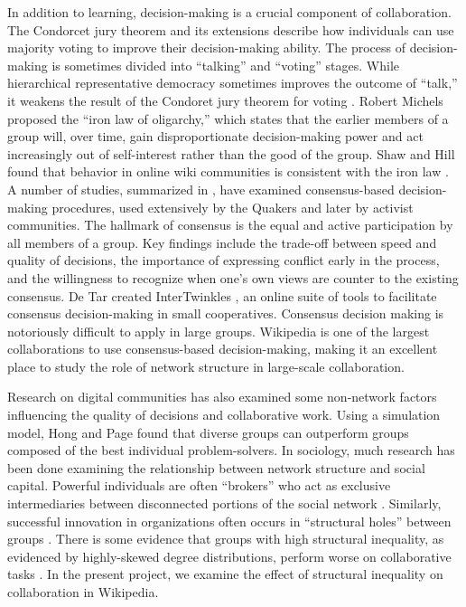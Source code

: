 In addition to learning, decision-making is a crucial component of collaboration.
The Condorcet jury theorem and its extensions \cite{list_epistemic_2001}
describe how individuals can use majority voting to improve their
decision-making ability.
The process of decision-making is sometimes divided into
``talking'' and ``voting'' stages.
While hierarchical representative democracy sometimes improves the outcome
of ``talk,'' it weakens the result of the Condoret jury theorem for voting
\cite{list_epistemic_2001}.
Robert Michels proposed the ``iron law of oligarchy,''
\cite{michels_political_1999} which states that
the earlier members of a group will, over time, gain disproportionate
decision-making power and act increasingly out of self-interest rather than
the good of the group.
Shaw and Hill found that behavior in online wiki communities is consistent
with the iron law \cite{shaw_laboratories_2014}.
A number of studies, summarized in \cite{gentry_consensus_1982},
have examined consensus-based decision-making procedures, used extensively by
the Quakers and later by activist communities.
The hallmark of consensus is the equal and active participation by all members
of a group.
Key findings include the trade-off between speed and quality of decisions,
the importance of expressing conflict early in the process,
and the willingness to recognize when one's own views are counter to the
existing consensus.
De Tar created InterTwinkles \cite{detar_intertwinkles:_2013},
an online suite of tools to facilitate consensus decision-making
in small cooperatives.
Consensus decision making is notoriously difficult to apply in large groups.
Wikipedia is one of the largest collaborations to use consensus-based
decision-making,
making it an excellent place to study the role of network structure in
large-scale collaboration.

Research on digital communities has also examined some non-network factors
influencing the quality of decisions and collaborative work.
Using a simulation model, Hong and Page \cite{hong_groups_2004} found that
diverse groups can outperform groups composed of the best individual
problem-solvers.
In sociology, much research has been done examining the relationship between
network structure and social capital.
Powerful individuals are often ``brokers''
who act as exclusive intermediaries between disconnected portions of the
social network \mbox{\cite{silverman_patronage_1965}}.
Similarly, successful innovation in organizations often occurs in ``structural
holes'' between groups \mbox{\cite{granovetter_strength_1973}}.
There is some evidence that groups with high structural inequality,
as evidenced by highly-skewed degree distributions,
perform worse on collaborative tasks \mbox{\cite{kearns_experiments_2012}}.
In the present project, we examine the effect of structural inequality
on collaboration in Wikipedia.

